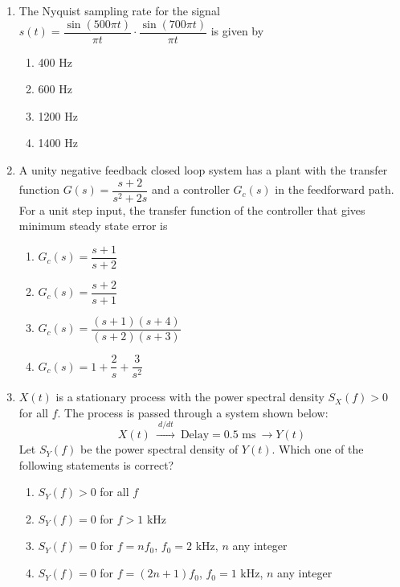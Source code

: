 \documentclass[journal,12pt,onecolumn]{IEEEtran}
\begin{document}
\begin{enumerate}
\item The Nyquist sampling rate for the signal $s(t)=\dfrac{\sin(500\pi t)}{\pi t}\cdot\dfrac{\sin(700\pi t)}{\pi t}$ is given by
\begin{multicols}{2}
\begin{enumerate}
\item 400 Hz
\item 600 Hz
\item 1200 Hz
\item 1400 Hz
\end{enumerate}
\end{multicols}

\item A unity negative feedback closed loop system has a plant with the transfer function $G(s)=\dfrac{s+2}{s^2+2s} $ and a controller $G_c(s)$ in the feedforward path. For a unit step input, the transfer function of the controller that gives minimum steady state error is
\begin{multicols}{2}
\begin{enumerate}
\item $G_c(s)=\dfrac{s+1}{s+2}$
\item $G_c(s)=\dfrac{s+2}{s+1}$
\item $G_c(s)=\dfrac{(s+1)(s+4)}{(s+2)(s+3)}$
\item $G_c(s)=1+\dfrac{2}{s}+\dfrac{3}{s^2}$
\end{enumerate}
\end{multicols}

\item $X(t)$ is a stationary process with the power spectral density $S_X(f)>0$ for all $f$. The process is passed through a system shown below:
$$
X(t)\ \xrightarrow{\ d/dt\ }\ \text{Delay}=0.5\text{ ms}\ \rightarrow Y(t)
$$
Let $S_Y(f)$ be the power spectral density of $Y(t)$. Which one of the following statements is correct?
\begin{multicols}{2}
\begin{enumerate}
\item $S_Y(f)>0$ for all $f$
\item $S_Y(f)=0$ for $f>1$ kHz
\item $S_Y(f)=0$ for $f=n f_0$, $f_0=2$ kHz, $n$ any integer
\item $S_Y(f)=0$ for $f=(2n+1) f_0$, $f_0=1$ kHz, $n$ any integer
\end{enumerate}
\end{multicols}


\end{enumerate}
\end{document}
